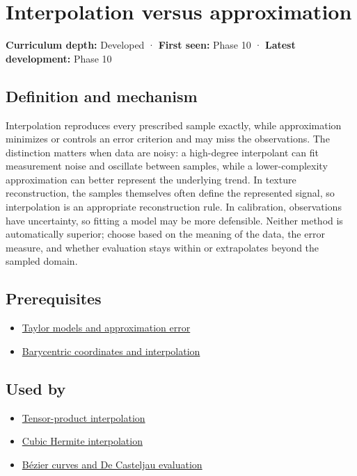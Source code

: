 \hypertarget{appendix-0c2a5f69851e}{}\label{referencestart:appendix-0c2a5f69851e}
\section{Interpolation versus approximation}\label{appendix-0c2a5f69851e-interpolation-versus-approximation}

\textbf{Curriculum depth:} Developed · \textbf{First seen:} Phase 10 · \textbf{Latest development:} Phase 10

\subsection{Definition and mechanism}\label{appendix-0c2a5f69851e-definition-and-mechanism}

Interpolation reproduces every prescribed sample exactly, while approximation minimizes or controls an error criterion and may miss the observations. The distinction matters when data are noisy: a high-degree interpolant can fit measurement noise and oscillate between samples, while a lower-complexity approximation can better represent the underlying trend. In texture reconstruction, the samples themselves often define the represented signal, so interpolation is an appropriate reconstruction rule. In calibration, observations have uncertainty, so fitting a model may be more defensible. Neither method is automatically superior; choose based on the meaning of the data, the error measure, and whether evaluation stays within or extrapolates beyond the sampled domain.

\subsection{Prerequisites}\label{appendix-0c2a5f69851e-prerequisites}

\begin{itemize}
\tightlist
\item
  \hyperref[appendix-32f39e9a3738]{Taylor models and approximation error}
\item
  \hyperref[appendix-02b9d9a81dca]{Barycentric coordinates and interpolation}
\end{itemize}

\subsection{Used by}\label{appendix-0c2a5f69851e-used-by}

\begin{itemize}
\tightlist
\item
  \hyperref[appendix-0a09b6dfdc86]{Tensor-product interpolation}
\item
  \hyperref[appendix-db3aef8f2fd6]{Cubic Hermite interpolation}
\item
  \hyperref[appendix-ddbec701898c]{Bézier curves and De Casteljau evaluation}
\end{itemize}

